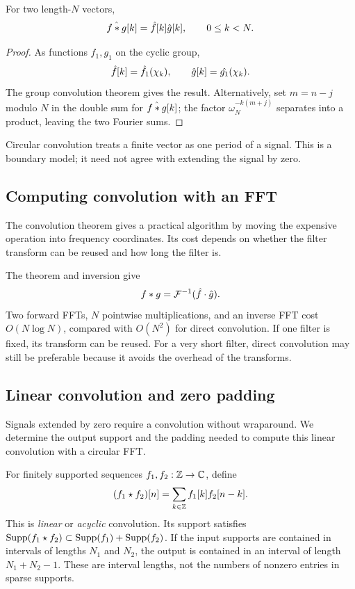 \begin{prop}
\label{prop-convol-tfd}
For two length-$N$ vectors,
\begin{equation}
\label{eq-formula-convolution-tfd}
 \hat{f*g}[k]=\hat{f}[k]\hat{g}[k],\qquad 0\leq k<N.
\end{equation}
\end{prop}
\begin{proof}
As functions $f_1,g_1$ on the cyclic group,
\begin{equation}
\label{eq-lien-tfd-trans-fourier}
 \hat{f}[k]=\hat{f_1}(\chi_k),\qquad \hat{g}[k]=\hat{g_1}(\chi_k).
\end{equation}
The group convolution theorem gives the result.
Alternatively, set $m=n-j$ modulo $N$ in the double sum for
$\hat{f*g}[k]$; the factor $\omega_N^{-k(m+j)}$ separates into a product,
leaving the two Fourier sums.
\end{proof}
Circular convolution treats a finite vector as one period of a signal.
This is a boundary model; it need not agree with extending the signal by zero.

\subsection{Computing convolution with an FFT}
\label{sect1-convolution-calcul-fft}

The convolution theorem gives a practical algorithm by moving the expensive
operation into frequency coordinates. Its cost depends on whether the filter
transform can be reused and how long the filter is.

The theorem and inversion give
\[
 f*g=\mathcal{F}^{-1}(\hat{f}\cdot\hat{g}).
\]
Two forward FFTs, $N$ pointwise multiplications, and an inverse FFT cost
$O(N\log N)$, compared with $O(N^2)$ for direct convolution.
If one filter is fixed, its transform can be reused.
For a very short filter, direct convolution may still be preferable because
it avoids the overhead of the transforms.

\subsection{Linear convolution and zero padding}
\label{sect1-convolution-acyclic}

Signals extended by zero require a convolution without wraparound. We
determine the output support and the padding needed to compute this linear
convolution with a circular FFT.

For finitely supported sequences $f_1,f_2:\mathbb{Z}\to\mathbb{C}$, define
\begin{equation}
\label{eq-convolution-acyclic}
 (f_1\star f_2)[n]=\sum_{k\in\mathbb{Z}}f_1[k]f_2[n-k].
\end{equation}
This is \emph{linear} or \emph{acyclic} convolution. Its support satisfies
$\operatorname{Supp}(f_1\star f_2)\subset\operatorname{Supp}(f_1)+\operatorname{Supp}(f_2)$.
If the input supports are contained in intervals of lengths $N_1$ and $N_2$,
the output is contained in an interval of length $N_1+N_2-1$.
These are interval lengths, not the numbers of nonzero entries in sparse supports.

